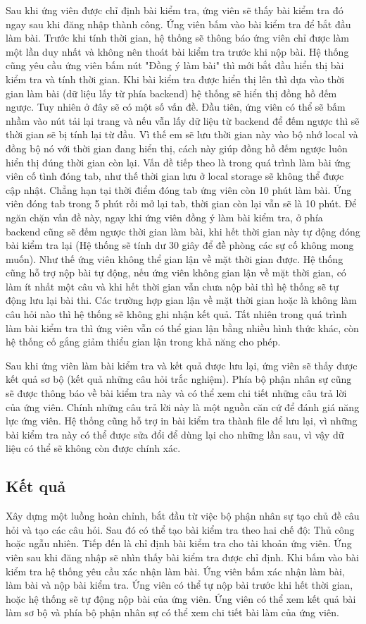 \documentclass[../DoAn.tex]{subfiles}
\begin{document}
Sau khi ứng viên được chỉ định bài kiểm tra, ứng viên sẽ thấy bài kiểm tra đó ngay sau khi đăng nhập thành công. Ứng viên bấm vào bài kiểm tra để bắt đầu làm bài. Trước khi tính thời gian, hệ thống sẽ thông báo ứng viên chỉ được làm một lần duy nhất và không nên thoát bài kiểm tra trước khi nộp bài. Hệ thống cũng yêu cầu ứng viên bấm nút "Đồng ý làm bài" thì mới bắt đầu hiển thị bài kiểm tra và tính thời gian. Khi bài kiểm tra được hiển thị lên thì dựa vào thời gian làm bài (dữ liệu lấy từ phía backend) hệ thống sẽ hiển thị đồng hồ đếm ngược. Tuy nhiên ở đây sẽ có một số vấn đề. Đầu tiên, ứng viên có thể sẽ bấm nhầm vào nút tải lại trang và nếu vẫn lấy dữ liệu từ backend để đếm ngược thì sẽ thời gian sẽ bị tính lại từ đầu. Vì thế em sẽ lưu thời gian này vào bộ nhớ local và đồng bộ nó với thời gian đang hiển thị, cách này giúp đồng hồ đếm ngược luôn hiển thị đúng thời gian còn lại. Vấn đề tiếp theo là trong quá trình làm bài ứng viên cố tình đóng tab, như thế thời gian lưu ở local storage sẽ không thể được cập nhật. Chẳng hạn tại thời điểm đóng tab ứng viên còn 10 phút làm bài. Ứng viên đóng tab trong 5 phút rồi mở lại tab, thời gian còn lại vẫn sẽ là 10 phút. Để ngăn chặn vấn đề này, ngay khi ứng viên đồng ý làm bài kiểm tra, ở phía backend cũng sẽ đếm ngược thời gian làm bài, khi hết thời gian này tự động đóng bài kiểm tra lại (Hệ thống sẽ tính dư 30 giây để đề phòng các sự cố không mong muốn). Như thế ứng viên không thể gian lận về mặt thời gian được. Hệ thống cũng hỗ trợ nộp bài tự động, nếu ứng viên không gian lận về mặt thời gian, có làm ít nhất một câu và khi hết thời gian vẫn chưa nộp bài thì hệ thống sẽ tự động lưu lại bài thi. Các trường hợp gian lận về mặt thời gian hoặc là không làm câu hỏi nào thì hệ thống sẽ không ghi nhận kết quả. Tất nhiên trong quá trình làm bài kiểm tra thì ứng viên vẫn có thể gian lận bằng nhiều hình thức khác, còn hệ thống cố gắng giảm thiểu gian lận trong khả năng cho phép.

Sau khi ứng viên làm bài kiểm tra và kết quả được lưu lại, ứng viên sẽ thấy được kết quả sơ bộ (kết quả những câu hỏi trắc nghiệm). Phía bộ phận nhân sự cũng sẽ được thông báo về bài kiểm tra này và có thể xem chi tiết những câu trả lời của ứng viên. Chính những câu trả lời này là một nguồn căn cứ để đánh giá năng lực ứng viên. Hệ thống cũng hỗ trợ in bài kiểm tra thành file để lưu lại, vì những bài kiểm tra này có thể được sửa đổi để dùng lại cho những lần sau, vì vậy dữ liệu có thể sẽ không còn được chính xác.

\subsection{Kết quả}
Xây dựng một luồng hoàn chỉnh, bắt đầu từ việc bộ phận nhân sự tạo chủ đề câu hỏi và tạo các câu hỏi. Sau đó có thể tạo bài kiểm tra theo hai chế độ: Thủ công hoặc ngẫu nhiên. Tiếp đến là chỉ định bài kiểm tra cho tài khoản ứng viên. Ứng viên sau khi đăng nhập sẽ nhìn thấy bài kiểm tra được chỉ định. Khi bấm vào bài kiểm tra hệ thống yêu cầu xác nhận làm bài. Ứng viên bấm xác nhận làm bài, làm bài và nộp bài kiểm tra. Ứng viên có thể tự nộp bài trước khi hết thời gian, hoặc hệ thống sẽ tự động nộp bài của ứng viên. Ứng viên có thể xem kết quả bài làm sơ bộ và phía bộ phận nhân sự có thể xem chi tiết bài làm của ứng viên.
\end{document}
